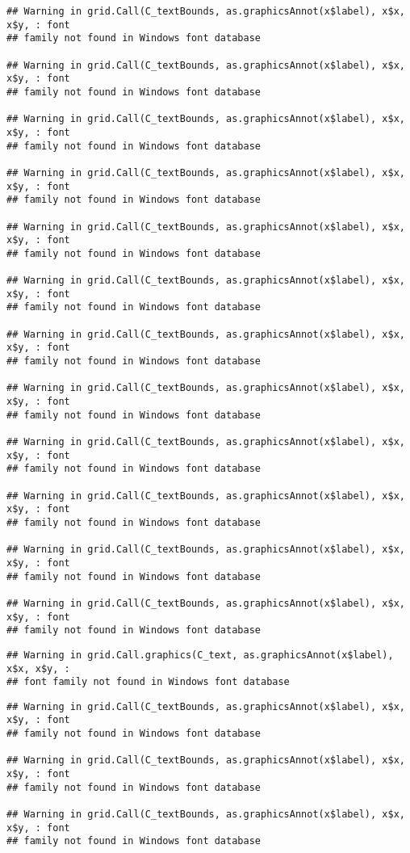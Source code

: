 \documentclass[
]{book}
\begin{document}
\begin{verbatim}
## Warning in grid.Call(C_textBounds, as.graphicsAnnot(x$label), x$x, x$y, : font
## family not found in Windows font database

## Warning in grid.Call(C_textBounds, as.graphicsAnnot(x$label), x$x, x$y, : font
## family not found in Windows font database

## Warning in grid.Call(C_textBounds, as.graphicsAnnot(x$label), x$x, x$y, : font
## family not found in Windows font database

## Warning in grid.Call(C_textBounds, as.graphicsAnnot(x$label), x$x, x$y, : font
## family not found in Windows font database

## Warning in grid.Call(C_textBounds, as.graphicsAnnot(x$label), x$x, x$y, : font
## family not found in Windows font database

## Warning in grid.Call(C_textBounds, as.graphicsAnnot(x$label), x$x, x$y, : font
## family not found in Windows font database

## Warning in grid.Call(C_textBounds, as.graphicsAnnot(x$label), x$x, x$y, : font
## family not found in Windows font database

## Warning in grid.Call(C_textBounds, as.graphicsAnnot(x$label), x$x, x$y, : font
## family not found in Windows font database

## Warning in grid.Call(C_textBounds, as.graphicsAnnot(x$label), x$x, x$y, : font
## family not found in Windows font database

## Warning in grid.Call(C_textBounds, as.graphicsAnnot(x$label), x$x, x$y, : font
## family not found in Windows font database

## Warning in grid.Call(C_textBounds, as.graphicsAnnot(x$label), x$x, x$y, : font
## family not found in Windows font database

## Warning in grid.Call(C_textBounds, as.graphicsAnnot(x$label), x$x, x$y, : font
## family not found in Windows font database
\end{verbatim}

\begin{verbatim}
## Warning in grid.Call.graphics(C_text, as.graphicsAnnot(x$label), x$x, x$y, :
## font family not found in Windows font database
\end{verbatim}

\begin{verbatim}
## Warning in grid.Call(C_textBounds, as.graphicsAnnot(x$label), x$x, x$y, : font
## family not found in Windows font database

## Warning in grid.Call(C_textBounds, as.graphicsAnnot(x$label), x$x, x$y, : font
## family not found in Windows font database

## Warning in grid.Call(C_textBounds, as.graphicsAnnot(x$label), x$x, x$y, : font
## family not found in Windows font database
\end{verbatim}
\end{document}
